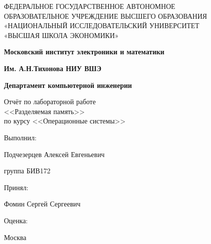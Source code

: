 \begin{titlepage}
	\begin{center}
		ФЕДЕРАЛЬНОЕ  ГОСУДАРСТВЕННОЕ АВТОНОМНОЕ \\
		ОБРАЗОВАТЕЛЬНОЕ УЧРЕЖДЕНИЕ ВЫСШЕГО ОБРАЗОВАНИЯ\\
		«НАЦИОНАЛЬНЫЙ ИССЛЕДОВАТЕЛЬСКИЙ УНИВЕРСИТЕТ\\
		«ВЫСШАЯ ШКОЛА ЭКОНОМИКИ»
	\end{center}
	
	\begin{center}
		\textbf{Московский институт электроники и математики}
		
		\textbf{Им. А.Н.Тихонова НИУ ВШЭ}
		
		\textbf{Департамент компьютерной инженерии}
	\end{center}	
	\vspace{6ex}
	\begin{center}
	Отчёт по лабораторной работе \\
	<<Разделяемая память>> \\ 
	 по курсу <<Операционные системы>>
	\end{center}	
	\vspace{5ex}
	
	Выполнил:
	
	Подчезерцев Алексей Евгеньевич 
	
	группа БИВ172
	
	\vspace{5ex}
	
	Принял:
	
	Фомин Сергей Сергеевич 
	
	\vspace{5ex}
	
	Оценка:


	\vfill
	\begin{center}
		Москва \the\year
	\end{center}
\end{titlepage}